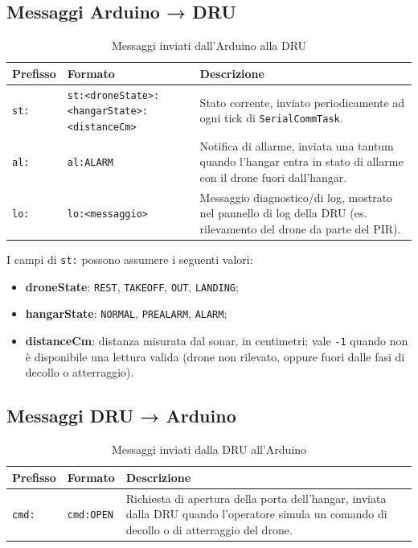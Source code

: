 \documentclass[a4paper,12pt]{report}
\begin{document}
\subsection{Messaggi Arduino → DRU}

\begin{table}[H]
\centering
\small
\begin{tabularx}{\textwidth}{|l|p{3.3cm}|X|}
\hline
\textbf{Prefisso} & \textbf{Formato} & \textbf{Descrizione} \\
\hline
\texttt{st:} &
\texttt{st:<droneState>:\linebreak <hangarState>:\linebreak <distanceCm>} &
Stato corrente, inviato periodicamente ad ogni tick di \texttt{SerialCommTask}. \\
\hline
\texttt{al:} &
\texttt{al:ALARM} &
Notifica di allarme, inviata una tantum quando l'hangar entra in stato di allarme con il drone fuori dall'hangar. \\
\hline
\texttt{lo:} &
\texttt{lo:<messaggio>} &
Messaggio diagnostico/di log, mostrato nel pannello di log della DRU (es. rilevamento del drone da parte del PIR). \\
\hline
\end{tabularx}
\caption{Messaggi inviati dall'Arduino alla DRU}
\end{table}

I campi di \texttt{st:} possono assumere i seguenti valori:
\begin{itemize}
    \item \textbf{droneState}: \texttt{REST}, \texttt{TAKEOFF}, \texttt{OUT}, \texttt{LANDING};
    \item \textbf{hangarState}: \texttt{NORMAL}, \texttt{PREALARM}, \texttt{ALARM};
    \item \textbf{distanceCm}: distanza misurata dal sonar, in centimetri;
    vale \texttt{-1} quando non è disponibile una lettura valida (drone non
    rilevato, oppure fuori dalle fasi di decollo o atterraggio).
\end{itemize}
\newpage
\subsection{Messaggi DRU → Arduino}

\begin{table}[H]
\centering
\small
\begin{tabularx}{\textwidth}{|l|p{3.3cm}|X|}
\hline
\textbf{Prefisso} & \textbf{Formato} & \textbf{Descrizione} \\
\hline
\texttt{cmd:} &
\texttt{cmd:OPEN} &
Richiesta di apertura della porta dell'hangar, inviata dalla DRU quando l'operatore simula un comando di decollo o di atterraggio del drone. \\
\hline
\end{tabularx}
\caption{Messaggi inviati dalla DRU all'Arduino}
\end{table}
\end{document}
